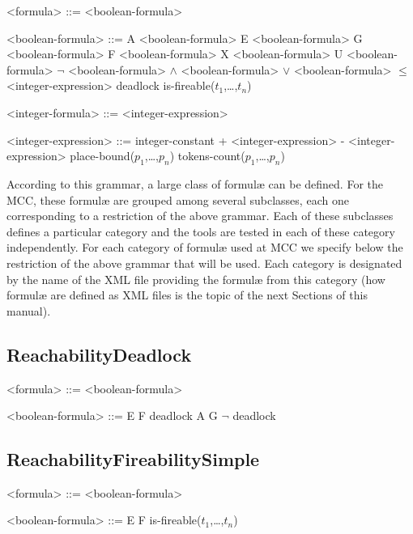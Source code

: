 \documentclass[10pt,english,a4paper]{article}
\begin{document}
\begin{grammar}
<formula> ::= <boolean-formula>

<boolean-formula> ::= A <boolean-formula>
\alt E <boolean-formula>
\alt G <boolean-formula>
\alt F <boolean-formula>
\alt X <boolean-formula>
 U <boolean-formula>
\alt $\lnot$ <boolean-formula>
 $\wedge$ <boolean-formula>
 $\vee$ <boolean-formula>
 $\leq$ <integer-expression>
\alt deadlock
\alt is-fireable($t_1$,\dots,$t_n$)

<integer-formula> ::= <integer-expression>

<integer-expression> ::= integer-constant
 + <integer-expression>
 - <integer-expression>
\alt place-bound($p_1$,\dots,$p_n$)
\alt tokens-count($p_1$,\dots,$p_n$)

\end{grammar}

According to this grammar, a large class of formulæ can be defined.
For the MCC, these formulæ are grouped among several subclasses, each one corresponding to a restriction of the above grammar.
Each of these subclasses defines a particular category and the tools are tested in each of these category independently.
For each category of formulæ used at MCC we specify below the restriction of the above grammar that will be used.
Each category is designated by the name of the XML file providing the formulæ from this category (how formulæ are defined as XML files is the topic of the next Sections of this manual).

\subsection{ReachabilityDeadlock}

\begin{grammar}

<formula> ::= <boolean-formula>

<boolean-formula> ::= E F deadlock 
\alt A G $\lnot$ deadlock

\end{grammar}

\subsection{ReachabilityFireabilitySimple}

\begin{grammar}

<formula> ::= <boolean-formula> 

<boolean-formula> ::= E F is-fireable($t_1$,\dots,$t_n$)

\end{grammar}
\end{document}
